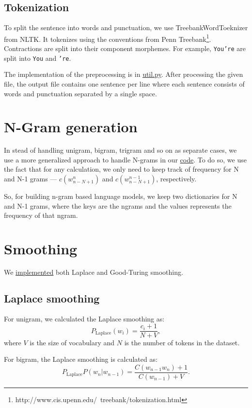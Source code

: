 \documentclass[12pt]{article}
\begin{document}
\subsection{Tokenization}
To split the sentence into words and punctuation, we use
TreebankWordToeknizer from NLTK. It tokenizes using the conventions from Penn
Treebank\footnote{http://www.cis.upenn.edu/~treebank/tokenization.html}.
Contractions are split into their component morphemes. For example,
\texttt{You're} are split into \texttt{You} and \texttt{'re}.

The implementation of the preprocessing is in
\href{https://github.com/saeed-abdullah/cs4740-language-model/blob/master/languagemodel/util.py\#L5}
{util.py}. After processing the given file, the output file contains
one sentence per line where each sentence consists of words and punctuation
separated by a single space.

\section{N-Gram generation}
In stead of handling unigram, bigram, trigram and so on as separate cases, we
use a more generalized approach to handle N-grams in our
\href{https://github.com/saeed-abdullah/cs4740-language-model/blob/master/languagemodel/NGrams.py}
{code}. To do so, we use the fact that for any calculation, we only need to keep
track of frequency for N and N-1 grams --- $c(w_{n-N+1}^{n})$ and 
$c(w_{n-N+1}^{n-1})$, respectively.

So, for building n-gram based language models, we keep two dictionaries for
N and N-1 grams, where the keys are the ngrams and the values represents
the frequency of that ngram.

\section{Smoothing}

We \href{https://github.com/saeed-abdullah/cs4740-language-model/blob/master/languagemodel/probability.py}
{implemented} both Laplace and Good-Turing smoothing.
\subsection{Laplace smoothing}
For unigram, we calculated the Laplace smoothing as:
\[P_{\text{Laplace}}(w_i) = \frac{c_i + 1}{N + V},\]
where $V$ is the size of vocabulary and $N$ is the number of tokens
in the dataset.

For bigram, the Laplace smoothing is calculated as:
\[P_{\text{Laplace}}P(w_n|w_{n-1}) = 
\frac{C(w_{n-1}w_n)  + 1}{C(w_{n-1}) + V}.\]
\end{document}
